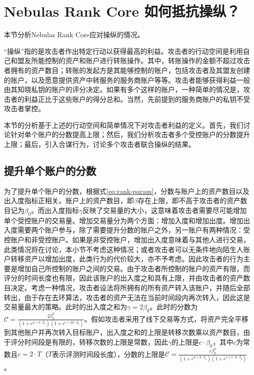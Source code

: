 
\section{Nebulas Rank Core 如何抵抗操纵？}
本节分析Nebulas Rank Core应对操纵的情况。

“操纵”指的是攻击者作出特定行动以获得最高的利益。攻击者的行动空间是利用自己和盟友所能控制的资产和账户进行转账操作。其中，转账操作的金额不超过攻击者拥有的资产数目；转账的发起方是其能够控制的账户，包括攻击者及其盟友创建的账户，以及愿意提供资产中转服务的服务商账户等等。攻击者能够获得利益一般由其知晓私钥的账户的评分决定。如果有多个这样的账户，一种简单的情况是，攻击者的利益正比于这些账户的得分总和。当然，先前提到的服务商账户的私钥不受攻击者掌控。

本节的分析基于上述的行动空间和简单情况下对攻击者利益的定义。首先，我们讨论针对单个账户的分数提高上限；然后，我们分析攻击者多个受控账户的分数提升上限；最后，引入合谋行为，讨论多个攻击者联合操纵的结果。


\subsection{提升单个账户的分数 \label{sec:cheat-single}}
为了提升单个账户的分数，根据式\ref{eq:rank-param}，分数与账户上的资产数目以及出入度指标正相关。账户上的资产数目，即$\beta$存在上限，即不高于攻击者的资产数目记为$\beta_0$。而出入度指标$\gamma$反映了交易量的大小，这意味着攻击者需要尽可能增加单个受控账户的交易量。增加交易量分为两个方面：增加入度和增加出度。增加出入度需要两个账户参与，除了需要提升分数的账户之外，另一账户有两种情况：受控账户和非受控账户。如果是非受控账户，增加出入度意味着与其他人进行交易，此类情况将在讨论，本小节不考虑这种情况；或者攻击者可以无条件地向陌生人账户转移资产以增加出度，此类行为的代价较大，亦不予考虑。因此攻击者的行为主要是增加自己所控制的账户之间的交易。由于攻击者所控制的账户的资产有限，而评分的时间长度也有限，因此该账户的出入度之和具有上限，并由攻击者的资产数目决定。考虑一种情况，攻击者设法将所拥有的所有资产转入该账户，并随后全部转出，由于存在去环算法，攻击者的资产无法在当前时间段内再次转入，因此这是交易量最大的策略。此时的出入度之和为$\gamma = 2 \beta_0$。此时的分数为$\mathcal{C} =  \frac{2 \beta_0 ^2}{ (1+e^{a + b \cdot \beta_0}) (1+e^{c + 2 d \cdot \beta_0})}$。假如攻击者采用了线下交易等方式，将资产完全平移到其他账户并再次转入目标账户，出入度之和的上限是转移次数乘以资产数目，由于评分时间段是有限的，转移次数的上限是常数，因此$\gamma$的上限是$c \cdot \beta_0$，其中$c$为常数且$c=2\cdot T$（$T$表示评测时间段长度），分数的上限是$\mathcal{C} =  \frac{c \beta_0 ^2}{ (1+e^{a + b \cdot \beta_0}) (1+e^{c + c \cdot d \cdot \beta_0})}$。

